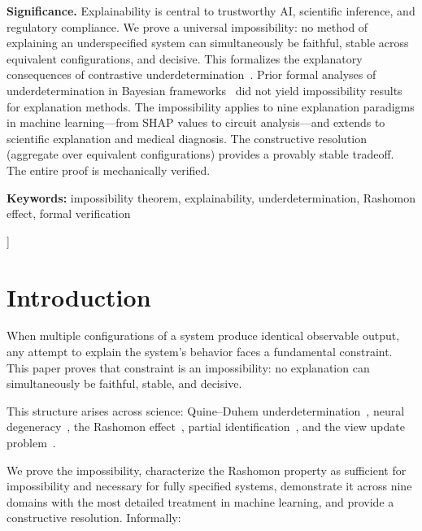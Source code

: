 \documentclass[twocolumn]{article}
\begin{document}
\begin{@twocolumnfalse}
\medskip

\noindent\textbf{Significance.}\quad
Explainability is central to trustworthy AI, scientific inference, and
regulatory compliance. We prove a universal impossibility: no method of
explaining an underspecified system can simultaneously be faithful,
stable across equivalent configurations, and decisive.
This formalizes the explanatory consequences of contrastive
underdetermination~\cite{laudan1991empirical}. Prior formal analyses of underdetermination
in Bayesian frameworks~\cite{dorling1979bayesian,howson2006scientific} did not yield
impossibility results for explanation methods. The impossibility
applies to nine explanation paradigms in machine learning---from
SHAP values to circuit analysis---and extends to scientific
explanation and medical diagnosis. The constructive
resolution (aggregate over equivalent configurations) provides
a provably stable tradeoff. The entire proof is mechanically verified.

\medskip

\noindent\textbf{Keywords:} impossibility theorem, explainability, underdetermination, Rashomon effect, formal verification

\vspace{1em}
\end{@twocolumnfalse}
]

\section{Introduction}
\label{sec:intro}

When multiple configurations of a system produce identical observable
output, any attempt to explain the system's behavior faces a fundamental
constraint. This paper proves that constraint is an impossibility: no
explanation can simultaneously be faithful, stable, and decisive.

This structure arises across science: Quine--Duhem
underdetermination~\cite{quine1951dogmas,duhem1906aim}, neural
degeneracy~\cite{marder2006variability,edelman2001degeneracy}, the
Rashomon effect~\cite{breiman2001random,rudin2024amazing}, partial
identification~\cite{manski2003partial}, and the view update
problem~\cite{bancilhon1981update}.

We prove the impossibility, characterize the Rashomon
property as sufficient for impossibility and necessary for fully specified systems,
demonstrate it across nine domains
with the most detailed treatment in machine learning, and provide a
constructive resolution. Informally:
\end{document}
